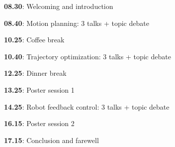 \documentclass[12pt]{article}
\begin{document}
\textbf{08.30}: Welcoming and introduction

\textbf{08.40}: Motion planning: 3 talks + topic debate

\textbf{10.25}: Coffee break

\textbf{10.40}: Trajectory optimization: 3 talks + topic debate

\textbf{12.25}: Dinner break

\textbf{13.25}: Poster session 1

\textbf{14.25}: Robot feedback control: 3 talks + topic debate

\textbf{16.15}: Poster session 2

\textbf{17.15}: Conclusion and farewell
\end{document}
